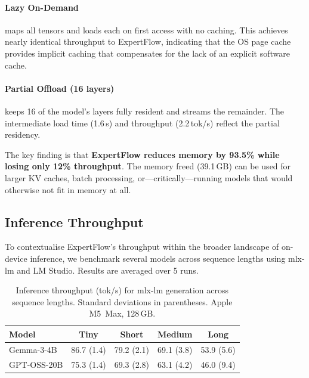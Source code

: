 \documentclass[11pt,a4paper]{article}
\begin{document}
\paragraph{Lazy On-Demand} maps all tensors and loads each on first access
with no caching. This achieves nearly identical throughput to ExpertFlow,
indicating that the OS page cache provides implicit caching that compensates
for the lack of an explicit software cache.

\paragraph{Partial Offload (16 layers)} keeps 16 of the model's layers fully
resident and streams the remainder. The intermediate load time (1.6\,s) and
throughput (2.2\,tok/s) reflect the partial residency.

The key finding is that \textbf{ExpertFlow reduces memory by 93.5\% while
losing only 12\% throughput}. The memory freed (39.1\,GB) can be used for
larger KV caches, batch processing, or---critically---running models that
would otherwise not fit in memory at all.

\subsection{Inference Throughput}
\label{sec:experiments:inference}

To contextualise ExpertFlow's throughput within the broader landscape of
on-device inference, we benchmark several models across sequence lengths using
mlx-lm and LM Studio. Results are averaged over 5 runs.

\begin{table}[t]
\centering
\caption{Inference throughput (tok/s) for mlx-lm generation across sequence
  lengths. Standard deviations in parentheses. Apple M5~Max, 128\,GB.}
\label{tab:inference-deep}
\begin{tabular}{lcccc}
\toprule
\textbf{Model} & \textbf{Tiny} & \textbf{Short} & \textbf{Medium} &
  \textbf{Long} \\
\midrule
Gemma-3-4B   & 86.7 (1.4) & 79.2 (2.1) & 69.1 (3.8) & 53.9 (5.6) \\
GPT-OSS-20B  & 75.3 (1.4) & 69.3 (2.8) & 63.1 (4.2) & 46.0 (9.4) \\
\bottomrule
\end{tabular}
\end{table}
\end{document}
